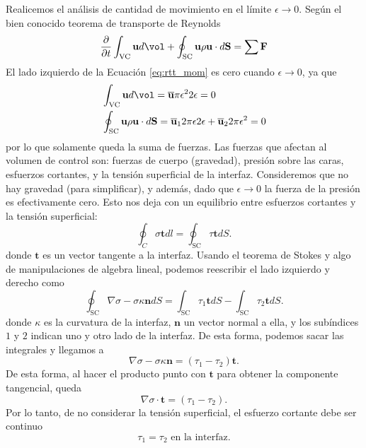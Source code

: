 Realicemos el análisis de cantidad de movimiento en el límite $\epsilon\to0$.
Según el bien conocido teorema de transporte de Reynolds
%
\begin{equation}\label{eq:rtt_mom}
\frac{\partial}{\partial t}\int_\text{VC} \mathbf{u} d\vol + \oint_\text{SC}\mathbf{u}\rho\mathbf{u}\cdot d\mathbf{S} = \sum\mathbf{F}
\end{equation}
%
El lado izquierdo de la Ecuación \eqref{eq:rtt_mom} es cero cuando $\epsilon\to0$, ya que
%
\begin{align}
&\int_\text{VC} \mathbf{u} d\vol = \overline{\mathbf{u}}\pi\epsilon^22\epsilon = 0\nonumber\\
&\oint_\text{SC}\mathbf{u}\rho\mathbf{u}\cdot d\mathbf{S} = \overline{\mathbf{u}}_12\pi\epsilon2\epsilon + \overline{\mathbf{u}}_22\pi\epsilon^2 = 0
\end{align}
%
por lo que solamente queda la suma de fuerzas.
Las fuerzas que afectan al volumen de control son: fuerzas de cuerpo (gravedad), presión sobre las caras, esfuerzos cortantes, y la tensión superficial de la interfaz.
Consideremos que no hay gravedad (para simplificar), y además, dado que $\epsilon\to0$ la fuerza de la presión es efectivamente cero. 
Esto nos deja con un equilibrio entre esfuerzos cortantes y la tensión superficial:
%
\begin{equation}
\oint_C \sigma \mathbf{t} dl = \oint_\text{SC} \tau \mathbf{t}dS.
\end{equation}
%
donde $\mathbf{t}$ es un vector tangente a la interfaz.
Usando el teorema de Stokes y algo de manipulaciones de algebra lineal, podemos reescribir el lado izquierdo y derecho como
%
\begin{equation}
\oint_\text{SC} \nabla\sigma -\sigma\kappa\mathbf{n} dS = \int_\text{SC} \tau_1 \mathbf{t}dS - \int_\text{SC} \tau_2 \mathbf{t}dS.
\end{equation}
%
donde $\kappa$ es la curvatura de la interfaz, $\mathbf{n}$ un vector normal a ella, y los subíndices $1$ y $2$ indican uno y otro lado de la interfaz.
De esta forma, podemos sacar las integrales y llegamos a
%
\begin{equation}\label{eq:interfaz_general}
\nabla\sigma -\sigma\kappa\mathbf{n} = (\tau_1 - \tau_2) \mathbf{t}.
\end{equation}
%
De esta forma, al hacer el producto punto con $\mathbf{t}$ para obtener la componente tangencial, queda
%
\begin{equation}
\nabla\sigma\cdot\mathbf{t} = (\tau_1 - \tau_2).
\end{equation}
%
Por lo tanto, de no considerar la tensión superficial, el esfuerzo cortante debe ser continuo
%
\begin{equation}\label{eq:interfaz}
\tau_1 = \tau_2 \text{ en la interfaz}.
\end{equation}

